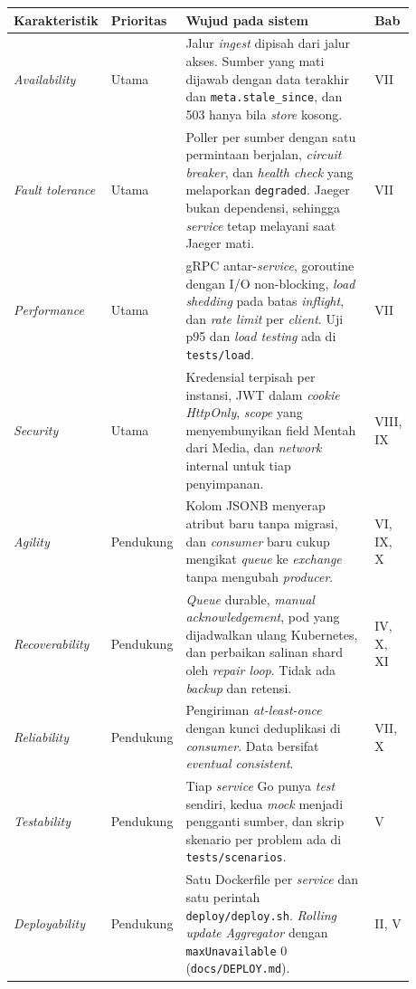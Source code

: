 \begin{longtable}[]{|>{\raggedright\arraybackslash}p{0.16\linewidth}|>{\raggedright\arraybackslash}p{0.12\linewidth}|>{\raggedright\arraybackslash}p{0.5\linewidth}|>{\raggedright\arraybackslash}p{0.1\linewidth}|}
\hline
Karakteristik & Prioritas & Wujud pada sistem & Bab \\
\hline
\endhead
\textit{Availability} & Utama & Jalur \textit{ingest} dipisah dari jalur akses. Sumber yang mati dijawab dengan data terakhir dan \texttt{meta.stale\_since}, dan 503 hanya bila \textit{store} kosong. & VII \\
\hline
\textit{Fault tolerance} & Utama & Poller per sumber dengan satu permintaan berjalan, \textit{circuit breaker}, dan \textit{health check} yang melaporkan \texttt{degraded}. Jaeger bukan dependensi, sehingga \textit{service} tetap melayani saat Jaeger mati. & VII \\
\hline
\textit{Performance} & Utama & gRPC antar-\textit{service}, goroutine dengan I/O non-blocking, \textit{load shedding} pada batas \textit{inflight}, dan \textit{rate limit} per \textit{client}. Uji p95 dan \textit{load testing} ada di \texttt{tests/load}. & VII \\
\hline
\textit{Security} & Utama & Kredensial terpisah per instansi, JWT dalam \textit{cookie} \textit{HttpOnly}, \textit{scope} yang menyembunyikan field Mentah dari Media, dan \textit{network} internal untuk tiap penyimpanan. & VIII, IX \\
\hline
\textit{Agility} & Pendukung & Kolom JSONB menyerap atribut baru tanpa migrasi, dan \textit{consumer} baru cukup mengikat \textit{queue} ke \textit{exchange} tanpa mengubah \textit{producer}. & VI, IX, X \\
\hline
\textit{Recoverability} & Pendukung & \textit{Queue} durable, \textit{manual acknowledgement}, pod yang dijadwalkan ulang Kubernetes, dan perbaikan salinan shard oleh \textit{repair loop}. Tidak ada \textit{backup} dan retensi. & IV, X, XI \\
\hline
\textit{Reliability} & Pendukung & Pengiriman \textit{at-least-once} dengan kunci deduplikasi di \textit{consumer}. Data bersifat \textit{eventual consistent}. & VII, X \\
\hline
\textit{Testability} & Pendukung & Tiap \textit{service} Go punya \textit{test} sendiri, kedua \textit{mock} menjadi pengganti sumber, dan skrip skenario per problem ada di \texttt{tests/scenarios}. & V \\
\hline
\textit{Deployability} & Pendukung & Satu Dockerfile per \textit{service} dan satu perintah \texttt{deploy/deploy.sh}. \textit{Rolling update} \textit{Aggregator} dengan \texttt{maxUnavailable} 0 (\texttt{docs/DEPLOY.md}). & II, V \\

\end{longtable}
